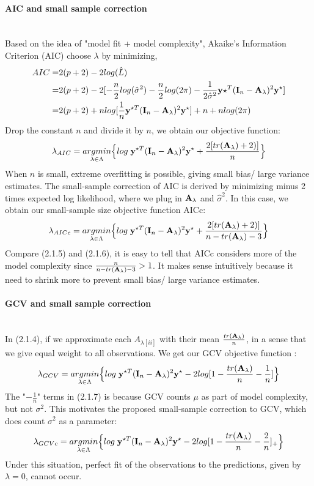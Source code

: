 \documentclass[11pt]{article}
\begin{document}
\paragraph{AIC and small sample correction}\mbox{}\\
Based on the idea of "model fit + model complexity", Akaike's Information Criterion (AIC) choose $\lambda$ by minimizing,
\begin{align*}
AIC=&2(p+2)-2log(\hat{L})\\
=&2(p+2)-2[-\frac{n}{2}log (\hat{\sigma}^2)-\frac{n}{2}log (2\pi)-\frac{1}{2\hat{\sigma}^2}{\bf y}{\star^T}({\bf I}_n-{\bf A}_\lambda)^2{\bf y}^\star]\\
=&2(p+2)+n log[\frac{1}{n}{\bf y}^{\star T}({\bf I}_n-{\bf A}_\lambda)^2{\bf y}^\star]+n+n log(2\pi)
\end{align*}
Drop the constant $n$ and divide it by $n$, we obtain our objective function:
\begin{align}
\lambda_{AIC}=\underset{\lambda \in \Lambda}{argmin}\Big\{log\; {\bf y}^{\star T}({\bf I}_n-{\bf A}_\lambda)^2{\bf y}^\star+\frac{2[tr({\bf A}_\lambda)+2)]}{n}\Big\}
\end{align}
When $n$ is small, extreme overfitting is possible, giving small bias/ large variance estimates. The small-sample correction of AIC is derived by minimizing minus 2 times expected log likelihood, where we plug in ${\bf A}_\lambda$ and $\hat{\sigma}^2$. In this case, we obtain our small-sample size objective function AICc:
\begin{align}
\lambda_{AICc}=\underset{\lambda \in \Lambda}{argmin}\Big\{log\; {\bf y}^{\star T}({\bf I}_n-{\bf A}_\lambda)^2{\bf y}^\star+\frac{2[tr({\bf A}_\lambda)+2)]}{n-tr({\bf A}_\lambda)-3}\Big\}
\end{align}
Compare (2.1.5) and (2.1.6), it is easy to tell that AICc considers more of the model complexity since $\frac{n}{n-tr({\bf A}_\lambda)-3}>1$. It makes sense intuitively because it need to shrink more to prevent small bias/ large variance estimates.

\paragraph{GCV and small sample correction}\mbox{}\\
In (2.1.4), if we approximate each $A_{\lambda[ii]}$ with their mean $\frac{tr({\bf A}_\lambda)}{n}$, in a sense that we give equal weight to all observations. We get our GCV objective function \citep{boonstra_tests_2016}:
\begin{align}
\lambda_{GCV}=\underset{\lambda \in \Lambda}{argmin}\Big\{log\; {\bf y}^{\star T}({\bf I}_n-{\bf A}_\lambda)^2{\bf y}^\star-2log[1-\frac{tr({\bf A}_\lambda)}{n}-\frac{1}{n}]\Big\}
\end{align}
The "$-\frac{1}{n}$" terms in (2.1.7) is because GCV counts $\mu$ as part of model complexity, but not $\sigma^2$. This motivates the proposed small-sample correction to GCV, which does count $\sigma^2$ as a parameter:
\begin{align}
\lambda_{GCVc}=\underset{\lambda \in \Lambda}{argmin}\Big\{log\; {\bf y}^{\star T}({\bf I}_n-{\bf A}_\lambda)^2{\bf y}^\star-2log[1-\frac{tr({\bf A}_\lambda)}{n}-\frac{2}{n}]_+\Big\}
\end{align}
Under this situation, perfect fit of the observations to the predictions, given by $\lambda=0$, cannot occur.
\end{document}
